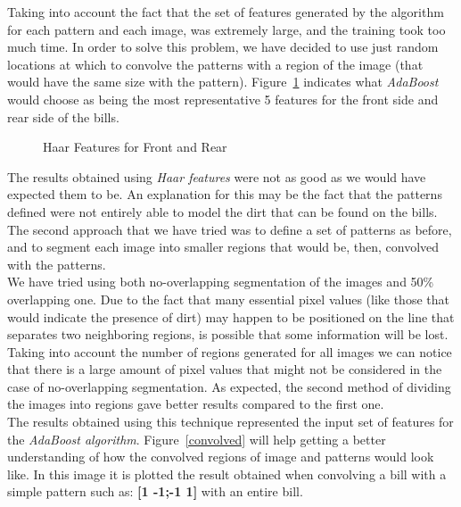 \documentclass[11pt,twocolumn]{article}
\begin{document}
\hspace*{10px}Taking into account the fact that the set of features generated by the algorithm for each pattern and each image, was extremely large, and the training took too much time. In order to solve this problem, we have decided to use just random locations at which to convolve the patterns with a region of the image (that would have the same size with the pattern). Figure~\ref{Haar_features} indicates what \emph{AdaBoost} would choose as being the most representative 5 features for the front side and rear side of the bills.\\
\begin{figure}[!hbtp]
\centering
{}
\caption{Haar Features for Front and Rear}
\label{Haar_features}
\end{figure}
	\hspace*{10px}The results obtained using \emph{Haar features} were not as good as we would have expected them to be. An explanation for this may be the fact that the patterns defined were not entirely able to model the dirt that can be found on the bills.\\
	\hspace*{10px}The second approach that we have tried was to define a set of patterns as before, and to segment each image into smaller regions that would be, then, convolved with the patterns.\\
	\hspace*{10px}We have tried using both no-overlapping segmentation of the images and 50\% overlapping one. Due to the fact that many essential pixel values (like those that would indicate the presence of dirt) may happen to be positioned on the line that separates two neighboring regions, is possible that some information will be lost. Taking into account the number of regions generated for all images we can notice that there is a large amount of pixel values that might not be considered in the case of no-overlapping segmentation. As expected, the second method of dividing the images into regions gave better results compared to the first one.\\ 
	\hspace*{10px}The results obtained using this technique represented the input set of features for the \emph{AdaBoost algorithm}. Figure~\ref{convolved} will help getting a better understanding of how the convolved regions of image and patterns would look like. In this image it is plotted the result obtained when convolving a bill with a simple pattern such as: \textbf{[1 -1;-1 1]} with an entire bill.\\
\end{document}
